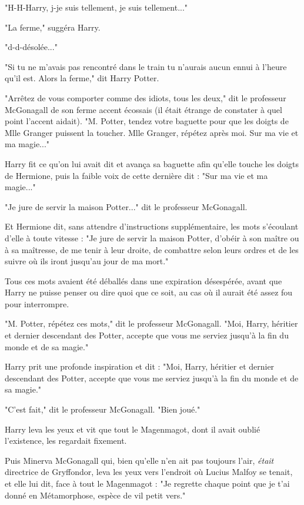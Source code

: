 "H-H-Harry, j-je suis tellement, je suis tellement..."

"La ferme," suggéra Harry.

"d-d-désolée..."

"Si tu ne m'avais pas rencontré dans le train tu n'aurais aucun ennui à l'heure qu'il est. Alors la ferme," dit Harry Potter.

"Arrêtez de vous comporter comme des idiots, tous les deux," dit le professeur McGonagall de son ferme accent écossais (il était étrange de constater à quel point l'accent aidait). "M. Potter, tendez votre baguette pour que les doigts de Mlle Granger puissent la toucher. Mlle Granger, répétez après moi. Sur ma vie et ma magie..."

Harry fit ce qu'on lui avait dit et avança sa baguette afin qu'elle touche les doigts de Hermione, puis la faible voix de cette dernière dit : "Sur ma vie et ma magie..."

"Je jure de servir la maison Potter..." dit le professeur McGonagall.

Et Hermione dit, sans attendre d'instructions supplémentaire, les mots s'écoulant d'elle à toute vitesse : "Je jure de servir la maison Potter, d'obéir à son maître ou à sa maîtresse, de me tenir à leur droite, de combattre selon leurs ordres et de les suivre où ils iront jusqu'au jour de ma mort."

Tous ces mots avaient été déballés dans une expiration désespérée, avant que Harry ne puisse penser ou dire quoi que ce soit, au cas où il aurait été assez fou pour interrompre.

"M. Potter, répétez ces mots," dit le professeur McGonagall. "Moi, Harry, héritier et dernier descendant des Potter, accepte que vous me serviez jusqu'à la fin du monde et de sa magie."

Harry prit une profonde inspiration et dit : "Moi, Harry, héritier et dernier descendant des Potter, accepte que vous me serviez jusqu'à la fin du monde et de sa magie."

"C'est fait," dit le professeur McGonagall. "Bien joué."

Harry leva les yeux et vit que tout le Magenmagot, dont il avait oublié l'existence, les regardait fixement.

Puis Minerva McGonagall qui, bien qu'elle n'en ait pas toujours l'air, \emph{était}  directrice de Gryffondor, leva les yeux vers l'endroit où Lucius Malfoy se tenait, et elle lui dit, face à tout le Magenmagot : "Je regrette chaque point que je t'ai donné en Métamorphose, espèce de vil petit vers."

